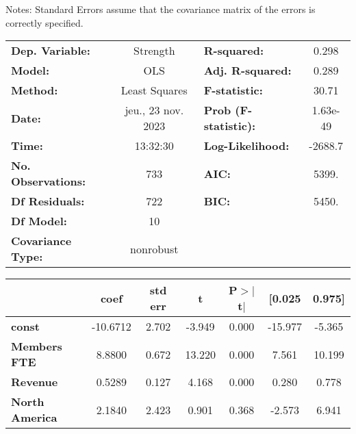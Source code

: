 \documentclass[ 11pt]{article}
\begin{document}
Notes: \newline
 [1] Standard Errors assume that the covariance matrix of the errors is correctly specified.
 \newpage
 \begin{center}
\begin{tabular}{lclc}
\toprule
\textbf{Dep. Variable:}        &      Strength      & \textbf{  R-squared:         } &     0.298   \\
\textbf{Model:}                &        OLS         & \textbf{  Adj. R-squared:    } &     0.289   \\
\textbf{Method:}               &   Least Squares    & \textbf{  F-statistic:       } &     30.71   \\
\textbf{Date:}                 & jeu., 23 nov. 2023 & \textbf{  Prob (F-statistic):} &  1.63e-49   \\
\textbf{Time:}                 &      13:32:30      & \textbf{  Log-Likelihood:    } &   -2688.7   \\
\textbf{No. Observations:}     &          733       & \textbf{  AIC:               } &     5399.   \\
\textbf{Df Residuals:}         &          722       & \textbf{  BIC:               } &     5450.   \\
\textbf{Df Model:}             &           10       & \textbf{                     } &             \\
\textbf{Covariance Type:}      &     nonrobust      & \textbf{                     } &             \\
\bottomrule
\end{tabular}
\begin{tabular}{lcccccc}
                               & \textbf{coef} & \textbf{std err} & \textbf{t} & \textbf{P$> |$t$|$} & \textbf{[0.025} & \textbf{0.975]}  \\
\midrule
\textbf{const}                 &     -10.6712  &        2.702     &    -3.949  &         0.000        &      -15.977    &       -5.365     \\
\textbf{Members FTE}           &       8.8800  &        0.672     &    13.220  &         0.000        &        7.561    &       10.199     \\
\textbf{Revenue}               &       0.5289  &        0.127     &     4.168  &         0.000        &        0.280    &        0.778     \\
\textbf{North America}         &       2.1840  &        2.423     &     0.901  &         0.368        &       -2.573    &        6.941     \\

\end{tabular}
\end{center}
\end{document}
